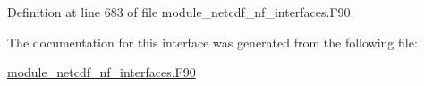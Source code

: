 Definition at line 683 of file module\+\_\+netcdf\+\_\+nf\+\_\+interfaces.\+F90.



The documentation for this interface was generated from the following file\+:\begin{DoxyCompactItemize}
\item 
\hyperlink{module__netcdf__nf__interfaces_8F90}{module\+\_\+netcdf\+\_\+nf\+\_\+interfaces.\+F90}\end{DoxyCompactItemize}
